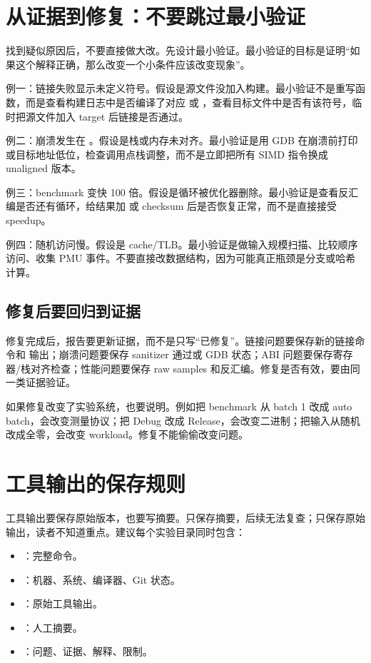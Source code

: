 \section{从证据到修复：不要跳过最小验证}

找到疑似原因后，不要直接做大改。先设计最小验证。最小验证的目标是证明“如果这个解释正确，那么改变一个小条件应该改变现象”。

例一：链接失败显示未定义符号。假设是源文件没加入构建。最小验证不是重写函数，而是查看构建日志中是否编译了对应  或 ，查看目标文件中是否有该符号，临时把源文件加入 target 后链接是否通过。

例二：崩溃发生在 。假设是栈或内存未对齐。最小验证是用 GDB 在崩溃前打印  或目标地址低位，检查调用点栈调整，而不是立即把所有 SIMD 指令换成 unaligned 版本。

例三：benchmark 变快 100 倍。假设是循环被优化器删除。最小验证是查看反汇编是否还有循环，给结果加  或 checksum 后是否恢复正常，而不是直接接受 speedup。

例四：随机访问慢。假设是 cache/TLB。最小验证是做输入规模扫描、比较顺序访问、收集 PMU 事件。不要直接改数据结构，因为可能真正瓶颈是分支或哈希计算。

\subsection{修复后要回归到证据}

修复完成后，报告要更新证据，而不是只写“已修复”。链接问题要保存新的链接命令和  输出；崩溃问题要保存 sanitizer 通过或 GDB 状态；ABI 问题要保存寄存器/栈对齐检查；性能问题要保存 raw samples 和反汇编。修复是否有效，要由同一类证据验证。

如果修复改变了实验系统，也要说明。例如把 benchmark 从 batch 1 改成 auto batch，会改变测量协议；把 Debug 改成 Release，会改变二进制；把输入从随机改成全零，会改变 workload。修复不能偷偷改变问题。

\section{工具输出的保存规则}

工具输出要保存原始版本，也要写摘要。只保存摘要，后续无法复查；只保存原始输出，读者不知道重点。建议每个实验目录同时包含：

\begin{itemize}
  \item {}：完整命令。
  \item {}：机器、系统、编译器、Git 状态。
  \item {}：原始工具输出。
  \item {}：人工摘要。
  \item {}：问题、证据、解释、限制。
\end{itemize}

